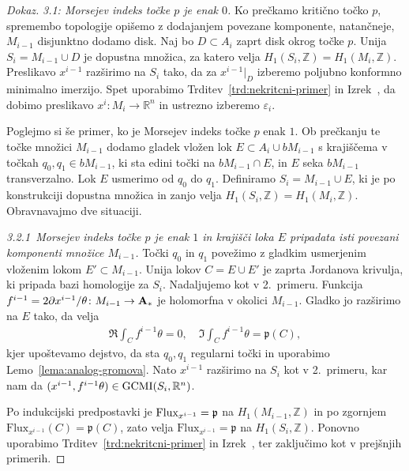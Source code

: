 \documentclass[12pt,a4paper,twoside]{article}
\theoremstyle{definition} %
\newenvironment{dokaz}[1][Dokaz]{\begin{proof}[#1]}{\end{proof}}
\theoremstyle{plain} %
\numberwithin{equation}{section}  %
\newcommand{\Z}{\mathbb Z}
\begin{document}
\begin{dokaz}
\textit{3.1: Morsejev indeks točke $p$ je enak $0$.} \newline
Ko prečkamo kritično točko $p$, spremembo topologije opišemo z dodajanjem povezane komponente, natančneje, $M_{i-1}$ disjunktno dodamo disk.
Naj bo $D \subset A_{i}$ zaprt disk okrog točke $p$. Unija $S_{i} = M_{i-1} \cup D$ je dopustna množica, za katero velja $H_{1}(S_{i}, \mathbb{Z}) = H_{1}(M_{i}, \mathbb{Z})$.
Preslikavo $x^{i-1}$ razširimo na $S_{i}$ tako, da za $x^{i-1}|_{D}$ izberemo poljubno konformno minimalno imerzijo.
Spet uporabimo Trditev~\ref{trd:nekritcni-primer} in Izrek~\cite[Theorem~3.4.1]{alarcon2021minimal},
da dobimo preslikavo $x^{i} \colon M_{i} \to \mathbb{R}^{n}$ in ustrezno izberemo $\varepsilon_{i}$. \newline

Poglejmo si še primer, ko je Morsejev indeks točke $p$ enak $1$. Ob prečkanju te točke množici $M_{i-1}$ dodamo gladek vložen lok $E \subset A_{i} \cup bM_{i-1}$ s krajiščema v točkah $q_0, q_1 \in bM_{i-1}$, ki sta edini točki na $bM_{i-1} \cap E$, in $E$ seka $bM_{i-1}$ transverzalno. Lok $E$ usmerimo od $q_0$ do $q_1$.
Definiramo $S_{i} = M_{i-1} \cup E$, ki je po konstrukciji dopustna množica in zanjo velja $H_{1}(S_{i}, \mathbb{Z}) = H_{1}(M_{i}, \mathbb{Z})$. Obravnavajmo dve situaciji. \newline

\textit{3.2.1~Morsejev indeks točke $p$ je enak $1$ in krajišči loka $E$ pripadata isti povezani komponenti množice $M_{i-1}$.} \newline
Točki $q_0$ in $q_1$ povežimo z gladkim usmerjenim vloženim lokom $E' \subset M_{i-1}$. 
Unija lokov $C = E \cup E'$ je zaprta Jordanova krivulja, ki pripada bazi homologije za $S_{i}$.
Nadaljujemo kot v 2.~primeru. Funkcija $f^{i-1} = 2 \partial x^{i-1} / \theta \colon M_{i-1} \to \textup{\textbf{A}}_{*}$ je holomorfna v okolici $M_{i-1}$.
Gladko jo razširimo na $E$ tako, da velja
\begin{gather*}
\Re \int_{C} f^{i-1} \theta = 0, \quad \Im \int_{C} f^{i-1} \theta = \mathfrak{p}(C),
\end{gather*}
kjer upoštevamo dejstvo, da sta $q_0, q_1$ regularni točki in uporabimo Lemo~\ref{lema:analog-gromova}.
Nato $x^{i-1}$ razširimo na $S_{i}$ kot v 2.~primeru, kar nam da $(x^{i-1}, f^{i-1} \theta) \in \textup{GCMI}(S_{i}, \mathbb{R}^{n})$.

Po indukcijski predpostavki je $\textup{Flux}_{x^{i-1}} = \mathfrak{p}$ na $H_{1}(M_{i-1},\Z)$ in po zgornjem $\text{Flux}_{x^{i-1}}(C) = \mathfrak{p}(C)$, zato velja
$\text{Flux}_{x^{i-1}} = \mathfrak{p}$ na $H_{1}(S_{i},\Z)$.
Ponovno uporabimo Trditev~\ref{trd:nekritcni-primer} in Izrek~\cite[Theorem~3.4.1]{alarcon2021minimal},
ter zaključimo kot v prejšnjih primerih. \newline


\end{dokaz}
\end{document}

